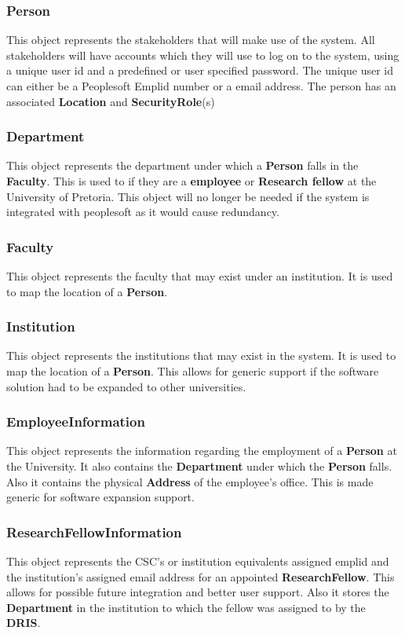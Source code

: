 \documentclass[12pt]{article}
\begin{document}
\newpage
\subsubsection{Person}
This object represents the stakeholders that will make use of the system. All stakeholders will have accounts which they will use to log on to the system, using a unique user id and a predefined or user specified password. The unique user id can either be a Peoplesoft Emplid number or a email address. The person has an associated \textbf{Location} and \textbf{SecurityRole}(s)

\subsubsection{Department}
This object represents the department under which a \textbf{Person} falls in the \textbf{Faculty}. This is used to if they are a \textbf{employee} or \textbf{Research fellow} at the University of Pretoria. This object will no longer be needed if the system is integrated with peoplesoft as it would cause redundancy.

\subsubsection{Faculty}
This object represents the faculty that may exist under an institution. It is used to map the location of a \textbf{Person}. 

\subsubsection{Institution}
This object represents the institutions that may exist in the system. It is used to map the location of a \textbf{Person}. This allows for generic support if the software solution had to be expanded to other universities.

\subsubsection{EmployeeInformation}
This object represents the information regarding the employment of a \textbf{Person} at the University. It also contains the \textbf{Department} under which the \textbf{Person} falls. Also it contains the physical \textbf{Address} of the employee's office. This is made generic for software expansion support.  

\subsubsection{ResearchFellowInformation}
This object represents the CSC's or institution equivalents assigned emplid and the institution's assigned email address for an appointed \textbf{ResearchFellow}. This allows for possible future integration and better user support. Also it stores the \textbf{Department} in the institution to which the fellow was assigned to by the \textbf{DRIS}.
\end{document}
